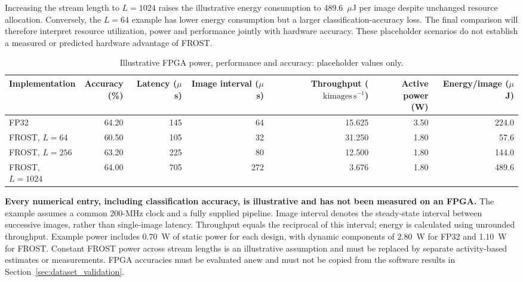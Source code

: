 \documentclass[pdflatex,sn-mathphys-num]{sn-jnl}
\theoremstyle{thmstyleone}
\theoremstyle{thmstyletwo}
\theoremstyle{thmstylethree}
\begin{document}
Increasing the stream length to $L=1024$ raises the illustrative energy consumption to 489.6~$\mu$J per image despite unchanged
resource allocation. Conversely, the $L=64$ example has lower energy consumption but a larger classification-accuracy loss. The final comparison will therefore interpret resource utilization,
power and performance jointly with hardware accuracy. These placeholder scenarios do not establish a measured or predicted hardware advantage of FROST.

\begin{table}[!htbp]
\centering
\caption{Illustrative FPGA power, performance and accuracy:
placeholder values only.}
\label{tab:fpga_ppa}

\begingroup
\small
\setlength{\tabcolsep}{4pt}
\renewcommand{\arraystretch}{1.08}

\begin{tabular*}{\linewidth}{@{\extracolsep{\fill}}lrrrrrr@{}}
\toprule
Implementation
& \shortstack{Accuracy\\(\%)}
& \shortstack{Latency\\($\mu$s)}
& \shortstack{Image interval\\($\mu$s)}
& \shortstack{Throughput\\($\mathrm{kimages}\,\mathrm{s}^{-1}$)}
& \shortstack{Active power\\(W)}
& \shortstack{Energy/image\\($\mu$J)}
\\
\midrule
FP32
& 64.20 & 145 & 64  & 15.625 & 3.50 & 224.0 \\

FROST, $L=64$
& 60.50 & 105 & 32  & 31.250 & 1.80 & 57.6 \\

FROST, $L=256$
& 63.20 & 225 & 80  & 12.500 & 1.80 & 144.0 \\

FROST, $L=1024$
& 64.00 & 705 & 272 & 3.676  & 1.80 & 489.6 \\
\bottomrule
\end{tabular*}

\par\smallskip
\noindent
\begin{minipage}{\linewidth}
\fontsize{8}{9.5}\selectfont
\textbf{Every numerical entry, including classification accuracy, is illustrative and has not been measured on an FPGA.}
The example assumes a common 200-MHz clock and a fully supplied pipeline. Image interval denotes the steady-state interval between successive images, rather than single-image latency. Throughput equals the reciprocal of this interval; energy is
calculated using unrounded throughput.
Example power includes 0.70~W of static power for each design, with dynamic components of 2.80~W for FP32 and 1.10~W for FROST. Constant FROST power across stream lengths is an illustrative
assumption and must be replaced by separate activity-based estimates
or measurements. FPGA accuracies must be evaluated anew and must not be copied
from the software results in Section~\ref{sec:dataset_validation}.
\end{minipage}

\endgroup
\end{table}
\end{document}
